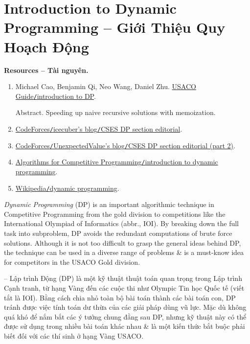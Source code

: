 \documentclass{article}
\begin{document}
\section{Introduction to Dynamic Programming -- Giới Thiệu Quy Hoạch Động}
\textbf{\textsf{Resources -- Tài nguyên.}}
\begin{enumerate}
    \item {\sc Michael Cao, Benjamin Qi, Neo Wang, Daniel Zhu}. \href{https://usaco.guide/gold/intro-dp}{USACO Guide{\tt/}introduction to DP}.

    {\sf Abstract.} Speeding up naive recursive solutions with memoization.

    \item \href{https://codeforces.com/blog/entry/70018}{CodeForces{\tt/}icecuber's blog{\tt/}CSES DP section editorial}.

    \item \href{https://codeforces.com/blog/entry/111675}{CodeForces{\tt/}UnexpectedValue's blog{\tt/}CSES DP section editorial (part 2)}.

    \item \href{https://cp-algorithms.com/dynamic_programming/intro-to-dp.html}{Algorithms for Competitive Programming{\tt/}introduction to dynamic programming}.

    \item \href{https://en.wikipedia.org/wiki/Dynamic_programming}{Wikipedia{\tt/}dynamic programming}.
\end{enumerate}
{\it Dynamic Programming} (DP) is an important algorithmic technique in Competitive Programming from the gold division to competitions like the International Olympiad of Informatics (abbr., IOI). By breaking down the full task into subproblem, DP avoids the redundant computations of brute force solutions. Although it is not too difficult to grasp the general ideas behind DP, the technique can be used in a diverse range of problems \& is a must-know idea for competitors in the USACO Gold division.

-- Lập trình Động (DP) là một kỹ thuật thuật toán quan trọng trong Lập trình Cạnh tranh, từ hạng Vàng đến các cuộc thi như Olympic Tin học Quốc tế (viết tắt là IOI). Bằng cách chia nhỏ toàn bộ bài toán thành các bài toán con, DP tránh được việc tính toán dư thừa của các giải pháp dùng vũ lực. Mặc dù không quá khó để nắm bắt các ý tưởng chung đằng sau DP, nhưng kỹ thuật này có thể được sử dụng trong nhiều bài toán khác nhau \& là một kiến thức bắt buộc phải biết đối với các thí sinh ở hạng Vàng USACO.
\end{document}
